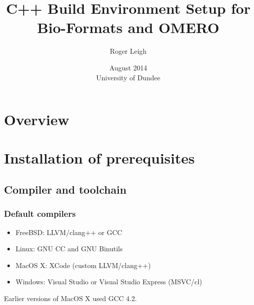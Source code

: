 \documentclass{beamer}
\title{C++ Build Environment Setup for Bio-Formats and OMERO}
\author{Roger Leigh}
\date{August 2014\\University of Dundee}
\begin{document}
\begin{frame}[plain]
  \titlepage
  \begin{center}
     \hfill
    \hfill
  \end{center}
\end{frame}

\section*{Overview}

\section{Installation of prerequisites}
\subsection{Compiler and toolchain}
\begin{frame}
  \frametitle{Default compilers}
  \begin{itemize}
  \item FreeBSD: LLVM/clang++ or GCC
  \item Linux: GNU CC and GNU Binutils
  \item MacOS X: XCode (custom LLVM/clang++)
  \item Windows: Visual Studio or Visual Studio Express (MSVC/cl)
  \end{itemize}

  Earlier versions of MacOS X used GCC 4.2.
\end{frame}
\end{document}
